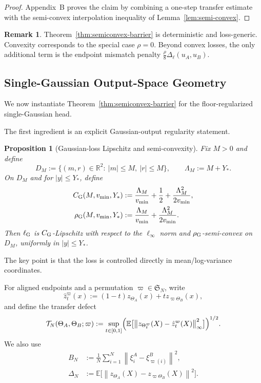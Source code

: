 \documentclass[11pt]{article}
\newtheorem{proposition}[theorem]{Proposition}
\theoremstyle{definition}
\newtheorem{remark}[theorem]{Remark}
\newcommand{\R}{\mathbb{R}}
\newcommand{\E}{\mathbb{E}}
\newcommand{\norm}[1]{\left\lVert #1 \right\rVert}
\newcommand{\abs}[1]{\left\lvert #1 \right\rvert}
\newcommand{\cT}{\mathcal{T}}
\begin{document}
\begin{proof}
Appendix~B proves the claim by combining a one-step transfer estimate with the
semi-convex interpolation inequality of Lemma~\ref{lem:semi-convex}.
\end{proof}

\begin{remark}
Theorem~\ref{thm:semiconvex-barrier} is deterministic and loss-generic.
Convexity corresponds to the special case $\rho=0$. Beyond convex losses, the
only additional term is the endpoint mismatch penalty
$\frac{\rho}{8}\Delta_\ell(u_A,u_B)$.
\end{remark}

\subsection{Single-Gaussian Output-Space Geometry}
\label{sec:output-geometry}

We now instantiate Theorem~\ref{thm:semiconvex-barrier} for the floor-regularized
single-Gaussian head.

The first ingredient is an explicit Gaussian-output regularity statement.

\begin{proposition}[Gaussian-loss Lipschitz and semi-convexity]
\label{prop:gaussian-regularity}
Fix $M>0$ and define
\[
  D_M:=\{(m,r)\in\R^2:\ \abs{m}\le M,\ \abs{r}\le M\},
  \qquad
  \Lambda_M:=M+Y_\ast.
\]
On $D_M$ and for $\abs{y}\le Y_\ast$, define
\begin{align}
  C_{\rm G}(M,v_{\min},Y_\ast)
  &:=
  \frac{\Lambda_M}{v_{\min}}
  +
  \frac12
  +
  \frac{\Lambda_M^2}{2v_{\min}},
  \label{eq:CG}
  \\
  \rho_{\rm G}(M,v_{\min},Y_\ast)
  &:=
  \frac{\Lambda_M}{v_{\min}}
  +
  \frac{\Lambda_M^2}{2v_{\min}}.
  \label{eq:rhoG}
\end{align}
Then $\ell_{\rm G}$ is $C_{\rm G}$-Lipschitz with respect to the
$\ell_\infty$ norm and $\rho_{\rm G}$-semi-convex on $D_M$, uniformly in
$\abs{y}\le Y_\ast$.
\end{proposition}

The key point is that the loss is controlled directly in mean/log-variance
coordinates.

For aligned endpoints and a permutation $\varpi\in\mathfrak{S}_N$, write
\[
  \hat z_t^\varpi(x)
  :=
  (1-t)z_{\Theta_A}(x)+t z_{\varpi\Theta_B}(x),
\]
and define the transfer defect
\begin{equation}
  \cT_N(\Theta_A,\Theta_B;\varpi)
  :=
  \sup_{t\in[0,1]}
  \Bigl(
    \E\bigl[
      \norm{z_{\Theta_t^\varpi}(X)-\hat z_t^\varpi(X)}_\infty^2
    \bigr]
  \Bigr)^{1/2}.
  \label{eq:Tn}
\end{equation}
We also use
\begin{align}
  B_N
  &:=
  \frac1N\sum_{i=1}^N \norm{\xi_i^A-\xi_{\varpi(i)}^B}^2,
  \label{eq:BN}
  \\
  \Delta_N
  &:=
  \E\bigl[\norm{z_{\Theta_A}(X)-z_{\varpi\Theta_B}(X)}^2\bigr].
  \label{eq:DeltaN}
\end{align}
\end{document}
